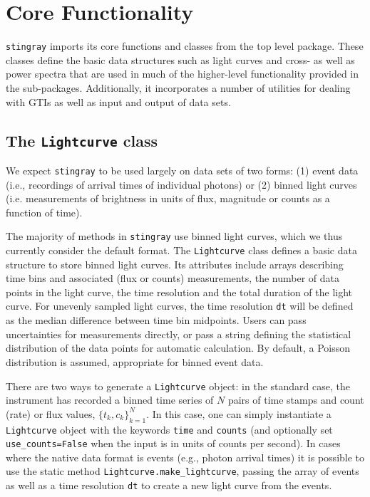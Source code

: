 \documentclass[twocolumn]{aastex62}
\newcommand{\stingray}{\texttt{stingray}\xspace}
\newcommand{\lightcurve}{\texttt{Lightcurve}\xspace}
\begin{document}
\section{Core Functionality}
\label{sec:core}

\stingray imports its core functions and classes from the top level package. 
These classes define the basic data structures such as light curves and cross- as well as power spectra that are used in much of the higher-level functionality provided in the sub-packages. 
Additionally, it incorporates a number of utilities for dealing with GTIs as well as input and output of data sets. 

\subsection{The \texttt{Lightcurve} class}
\label{sec:lightcurve}

We expect \stingray to be used largely on data sets of two forms: (1) event data (i.e., recordings of arrival times of individual photons) or (2) binned light curves (i.e. measurements of brightness in units of flux, magnitude or counts as a function of time). 

The majority of methods in \stingray use binned light curves, which we thus currently consider the default format. 
The \lightcurve class defines a basic data structure to store binned light curves. Its attributes include arrays describing time bins and associated (flux or counts) measurements, the number of data points in the light curve, the time resolution and the total duration of the light curve. 
For unevenly sampled light curves, the time resolution \texttt{dt} will be defined as the median difference between time bin midpoints. Users can pass uncertainties for measurements directly, or pass a string defining the statistical distribution of the data points for automatic calculation. 
By default, a Poisson distribution is assumed, appropriate for binned event data. 

There are two ways to generate a \texttt{Lightcurve} object: in the standard case, the instrument has recorded a binned time series of $N$ pairs of time stamps and count (rate) or flux values, $\{t_k, c_k \}_{k=1}^{N}$. 
In this case, one can simply instantiate a \texttt{Lightcurve} object with the keywords \texttt{time} and \texttt{counts} (and optionally set \texttt{use\_counts=False} when the input is in units of counts per second). 
In cases where the native data format is events (e.g., photon arrival times) it is possible to use the static method \texttt{Lightcurve.make\_lightcurve}, passing the array of events as well as a time resolution \texttt{dt} to create a new light curve from the events.
\end{document}
